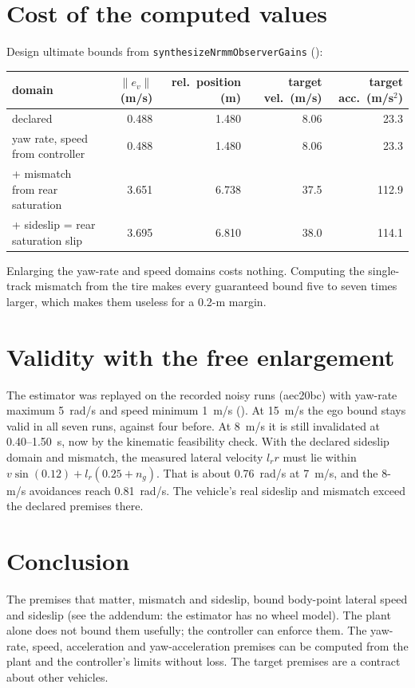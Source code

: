 \documentclass[11pt]{article}
\begin{document}
\section{Cost of the computed values}
Design ultimate bounds from \texttt{synthesizeNrmmObserverGains}
():
\begin{center}
\begin{tabular}{lrrrr}
\toprule
domain & $\|e_v\|$ (m/s) & rel.\ position (m) & target vel.\ (m/s) & target acc.\ (m/s$^2$)\\
\midrule
declared & 0.488 & 1.480 & 8.06 & 23.3\\
yaw rate, speed from controller & 0.488 & 1.480 & 8.06 & 23.3\\
+ mismatch from rear saturation & 3.651 & 6.738 & 37.5 & 112.9\\
+ sideslip = rear saturation slip & 3.695 & 6.810 & 38.0 & 114.1\\
\bottomrule
\end{tabular}
\end{center}
Enlarging the yaw-rate and speed domains costs nothing. Computing the
single-track mismatch from the tire makes every guaranteed bound five to seven
times larger, which makes them useless for a 0.2-m margin.

\section{Validity with the free enlargement}
The estimator was replayed on the recorded noisy runs (aec20bc) with yaw-rate
maximum 5~rad/s and speed minimum 1~m/s
(). At 15~m/s
the ego bound stays valid in all seven runs, against four before. At 8~m/s
it is still invalidated at 0.40--1.50~s, now by the kinematic feasibility
check. With the declared sideslip domain and mismatch, the measured lateral
velocity $l_r r$ must lie within $v\sin(0.12)+l_r(0.25+n_g)$. That is about
0.76~rad/s at 7~m/s, and the 8-m/s avoidances reach 0.81~rad/s. The vehicle's
real sideslip and mismatch exceed the declared premises there.

\section{Conclusion}
The premises that matter, mismatch and sideslip, bound body-point lateral
speed and sideslip (see the addendum: the estimator has no wheel model). The
plant alone does not bound them usefully; the controller can enforce them. The yaw-rate, speed, acceleration and
yaw-acceleration premises can be computed from the plant and the controller's
limits without loss. The target premises are a contract about other vehicles.
\end{document}
